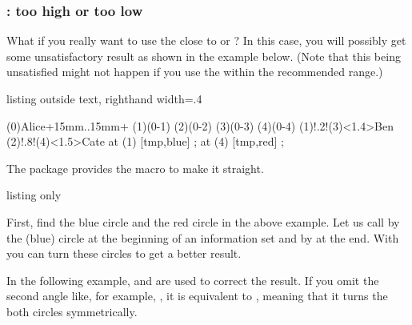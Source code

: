 \subsubsection{\protect\cmd{\xtCInfosetOTurnX}: too high or too low }
\label{ssec:extrememidpointfactor}

What if you really want to use the  close to  or ?
In this case, you will possibly get some unsatisfactory result as shown in the example below.
(Note that this being unsatisfied might not happen if you use the  within the recommended range.)

\begin{tcblisting}{listing outside text, righthand width=.4\linewidth}
\begin{istgame}[yscale=1.5,font=\scriptsize]
\xtdistance{10mm}{10mm}
\istroot(0){Alice}+15mm..15mm+
      \istb \istb \istb \istb \endist
\istroot(1)(0-1)  \istb \istb \endist
\istroot(2)(0-2)  \istb \istb \endist
\istroot(3)(0-3)  \istb \istb \endist
\istroot(4)(0-4)  \istb \istb \endist
\xtCInfosetO[fill=blue!20]
   (1)!.2!(3)<1.4>{Ben}
\xtCInfosetO[fill=red!40,opacity=.5]
   (2)!.8!(4)<1.5>{Cate}
\node at (1) [tmp,blue] {};
\node at (4) [tmp,red] {};
\end{istgame}
\end{tcblisting}

The package provides the macro \icmd{\xtCInfosetOTurnX} to make it straight.

\begin{tcblisting}{listing only}
\end{tcblisting}

First, find the blue circle and the red circle in the above example.
Let us call by  the (blue) circle at the beginning of an information set and by  at the end.
With \cmd{\xtCInfosetOTurnX} you can turn these circles to get a better result.

In the following example,  and  are used to correct the result. If you omit the second angle like, for example, , it is equivalent to , meaning that it turns the both circles symmetrically.

